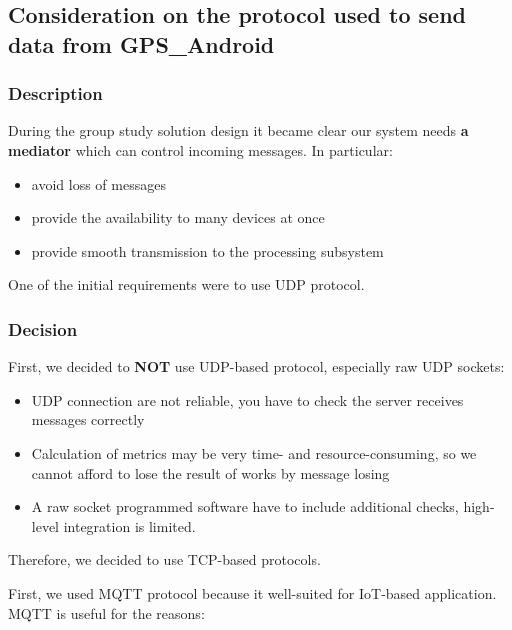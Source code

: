 \hypertarget{consideration-on-the-protocol-used-to-send-data-from-gps_android}{%
\subsection{Consideration on the protocol used to send data from
GPS\_Android}\label{consideration-on-the-protocol-used-to-send-data-from-gps_android}}

\hypertarget{description}{%
\subsubsection{Description}\label{description}}

During the group study solution design it became clear our system needs
\textbf{a mediator} which can control incoming messages. In particular:

\begin{itemize}
\tightlist
\item
  avoid loss of messages
\item
  provide the availability to many devices at once
\item
  provide smooth transmission to the processing subsystem
\end{itemize}

One of the initial requirements were to use UDP protocol.

\hypertarget{decision}{%
\subsubsection{Decision}\label{decision}}

First, we decided to \textbf{NOT} use UDP-based protocol, especially raw
UDP sockets:

\begin{itemize}
\tightlist
\item
  UDP connection are not reliable, you have to check the server receives
  messages correctly
\item
  Calculation of metrics may be very time- and resource-consuming, so we
  cannot afford to lose the result of works by message losing
\item
  A raw socket programmed software have to include additional checks,
  high-level integration is limited.
\end{itemize}

Therefore, we decided to use TCP-based protocols.

First, we used MQTT protocol because it well-suited for IoT-based
application. MQTT is useful for the reasons:

